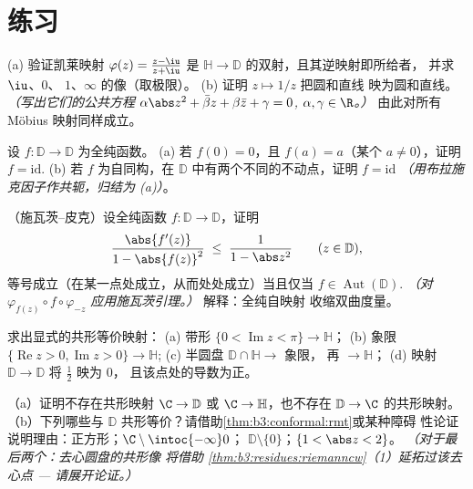 \section{练习}

\begin{exercise}[$\star$]\label{exo:b3:conformal:1}
(a) 验证凯莱映射 $\varphi(z) = \frac{z -
\iu}{z + \iu}$ 是 $\mathbb H \to \mathbb D$ 的双射，且其逆映射即所给者，
并求 $\iu$、$0$、
$1$、$\infty$ 的像（取极限）。
(b) 证明 $z \mapsto 1/z$ 把圆和直线
映为圆和直线。\emph{（写出它们的公共方程
$\alpha\abs z^2 + \bar\beta z + \beta\bar z + \gamma = 0$,
$\alpha, \gamma \in \R$。）} 由此对所有 M\"obius
映射同样成立。
\end{exercise}

\begin{exercise}[$\star$]\label{exo:b3:conformal:2}
设 $f \colon \mathbb D \to \mathbb D$ 为全纯函数。
(a) 若 $f(0) = 0$，且 $f(a) = a$（某个 $a \neq 0$），证明 $f
= \mathrm{id}$.
(b) 若 $f$ 为自同构，在
$\mathbb D$ 中有两个不同的不动点，证明 $f = \mathrm{id}$
\emph{（用布拉施克因子作共轭，归结为 (a)）}。
\end{exercise}

\begin{exercise}[$\star\star$]\label{exo:b3:conformal:3}
（施瓦茨--皮克）设全纯函数 $f\colon \mathbb D \to
\mathbb D$，证明
\[
\frac{\abs{f'(z)}}{1 - \abs{f(z)}^2} \;\leq\;
\frac{1}{1 - \abs z^2}
\qquad (z \in \mathbb D),
\]
等号成立（在某一点处成立，从而处处成立）当且仅当 $f \in
\operatorname{Aut}(\mathbb D)$.
\emph{（对 $\varphi_{f(z)}\circ
f\circ\varphi_{-z}$ 应用施瓦茨引理。）} 解释：全纯自映射
收缩双曲度量。
\end{exercise}

\begin{exercise}[$\star\star$]\label{exo:b3:conformal:4}
求出显式的共形等价映射：
(a) 带形 $\{0 < \operatorname{Im}z < \pi\} \to \mathbb H$；
(b) 象限 $\{\operatorname{Re}z > 0,
\operatorname{Im}z > 0\} \to \mathbb H$;
(c) 半圆盘 $\mathbb D\cap\mathbb H \to$ 象限，
再 $\to \mathbb H$；
(d) 映射 $\mathbb D \to \mathbb D$ 将 $\frac12$ 映为 $0$，
且该点处的导数为正。
\end{exercise}

\begin{exercise}[$\star\star$]\label{exo:b3:conformal:5}
（a）证明不存在共形映射 $\C \to \mathbb D$ 或 $\C \to
\mathbb H$，也不存在 $\mathbb D \to \C$ 的共形映射。
（b）下列哪些与
$\mathbb D$ 共形等价？请借助\cref{thm:b3:conformal:rmt}或某种障碍
性论证说明理由：正方形；$\C\setminus\intoc{-\infty}0$；
$\mathbb D\setminus\{0\}$；$\{1 < \abs z < 2\}$。
\emph{（对于最后两个：去心圆盘的共形像
将借助
\cref{thm:b3:residues:riemanncw}（1）延拓过该去心点 --- 请展开论证。）}
\end{exercise}

